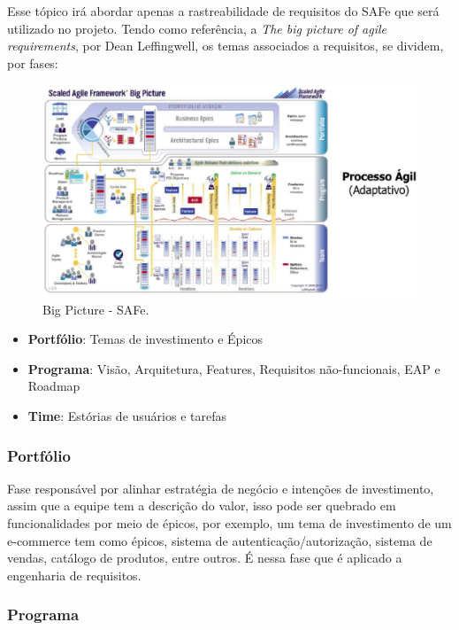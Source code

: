 Esse tópico irá abordar apenas a rastreabilidade de requisitos do SAFe que será utilizado no projeto. Tendo como
referência, a \textit{The big picture of agile requirements}, por Dean Leffingwell, os temas associados a requisitos, se
dividem, por fases: \cite{safe}

\begin{figure}[h!]
	\centering
  \includegraphics[keepaspectratio=true,scale=0.5]{figuras/safe.eps}
  \caption{Big Picture - SAFe.}
	\label{fig:safe}
\end{figure}

\begin{itemize}
  \item \textbf{Portfólio}: Temas de investimento e Épicos
  \item \textbf{Programa}: Visão, Arquitetura, Features, Requisitos não-funcionais, EAP e Roadmap
  \item \textbf{Time}: Estórias de usuários e tarefas
\end{itemize}

\subsubsection{Portfólio}

Fase responsável por alinhar estratégia de negócio e intenções de investimento, assim que a equipe tem a descrição do valor, isso pode ser quebrado em funcionalidades por meio de épicos, por exemplo, um tema de investimento de um e-commerce tem como épicos, sistema de autenticação/autorização, sistema de vendas, catálogo de produtos, entre outros. É nessa fase que é aplicado a engenharia de requisitos.

\subsubsection{Programa}

